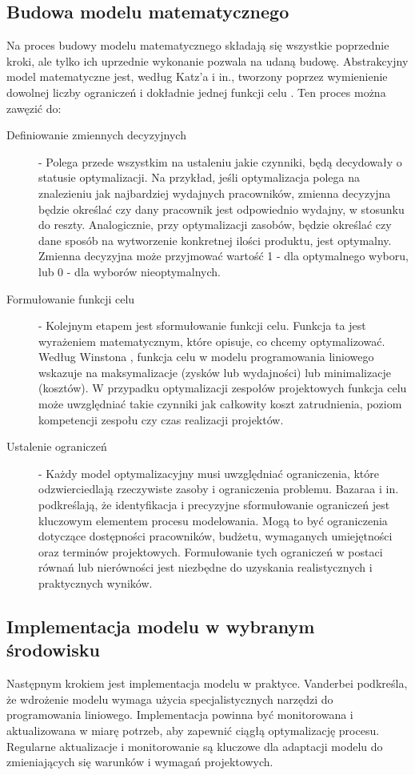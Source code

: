     \subsection{Budowa modelu matematycznego}
    \par Na proces budowy modelu matematycznego składają się wszystkie poprzednie kroki, ale tylko ich uprzednie wykonanie pozwala na udaną budowę. Abstrakcyjny model matematyczne jest, według Katz'a i in., tworzony poprzez wymienienie dowolnej liczby ograniczeń i dokładnie jednej funkcji celu \parencite{katz1980system}. Ten proces można zawęzić do:
    \begin{description}
        \item[Definiowanie zmiennych decyzyjnych] - Polega przede wszystkim na ustaleniu jakie czynniki, będą decydowały o statusie optymalizacji. Na przykład, jeśli optymalizacja polega na znalezieniu jak najbardziej wydajnych pracowników, zmienna decyzyjna będzie określać czy dany pracownik jest odpowiednio wydajny, w stosunku do reszty. Analogicznie, przy optymalizacji zasobów, będzie określać czy dane sposób na wytworzenie konkretnej ilości produktu, jest optymalny. Zmienna decyzyjna może przyjmować wartość 1 - dla optymalnego wyboru, lub 0 - dla wyborów nieoptymalnych.
        \item[Formułowanie funkcji celu] - Kolejnym etapem jest sformułowanie funkcji celu. Funkcja ta jest wyrażeniem matematycznym, które opisuje, co chcemy optymalizować. Według Winstona \parencite{winston2004operations}, funkcja celu w modelu programowania liniowego wskazuje na maksymalizacje (zysków lub wydajności) lub minimalizacje (kosztów). W przypadku optymalizacji zespołów projektowych funkcja celu może uwzględniać takie czynniki jak całkowity koszt zatrudnienia, poziom kompetencji zespołu czy czas realizacji projektów.
        \item[Ustalenie ograniczeń] - Każdy model optymalizacyjny musi uwzględniać ograniczenia, które odzwierciedlają rzeczywiste zasoby i ograniczenia problemu. Bazaraa i in. \parencite{bazaraa2010} podkreślają, że identyfikacja i precyzyjne sformułowanie ograniczeń jest kluczowym elementem procesu modelowania. Mogą to być ograniczenia dotyczące dostępności pracowników, budżetu, wymaganych umiejętności oraz terminów projektowych. Formułowanie tych ograniczeń w postaci równań lub nierówności jest niezbędne do uzyskania realistycznych i praktycznych wyników.
    \end{description}

    \subsection{Implementacja modelu w wybranym środowisku}
    \par Następnym krokiem jest implementacja modelu w praktyce. Vanderbei \parencite{vanderbei2001} podkreśla, że wdrożenie modelu wymaga użycia specjalistycznych narzędzi do programowania liniowego. Implementacja powinna być monitorowana i aktualizowana w miarę potrzeb, aby zapewnić ciągłą optymalizację procesu. Regularne aktualizacje i monitorowanie są kluczowe dla adaptacji modelu do zmieniających się warunków i wymagań projektowych.
    
